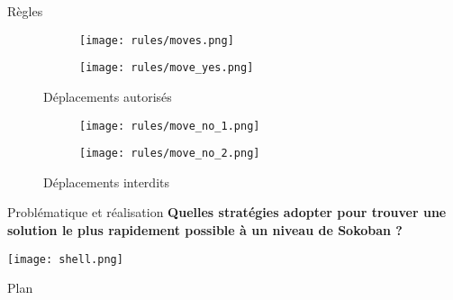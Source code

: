     \begin{frame}{Règles}

        \begin{figure}
            \begin{subfigure}[b]{0.4\textwidth}
                \centering
                \texttt{[image: rules/moves.png]}
            \end{subfigure}
            \hfill
            \begin{subfigure}[b]{0.4\textwidth}
                \centering
                \texttt{[image: rules/move\_yes.png]}
            \end{subfigure}
            \caption*{Déplacements autorisés}
        \end{figure}

         \begin{figure}
            \begin{subfigure}[b]{0.4\textwidth}
                \centering
                \texttt{[image: rules/move\_no\_1.png]}
            \end{subfigure}
            \hfill
            \begin{subfigure}[b]{0.4\textwidth}
                \centering
                \texttt{[image: rules/move\_no\_2.png]}
            \end{subfigure}
            \caption*{Déplacements interdits}
        \end{figure}
    \end{frame}


    \begin{frame}{Problématique et réalisation}
        \centering
        \Large\textbf{Quelles stratégies adopter pour trouver une solution le plus rapidement possible à un niveau de Sokoban ?}

        \vspace{1.5cm} %
        \texttt{[image: shell.png]}
     \end{frame}

    \begin{frame}{Plan}
        \tableofcontents%
    \end{frame}

